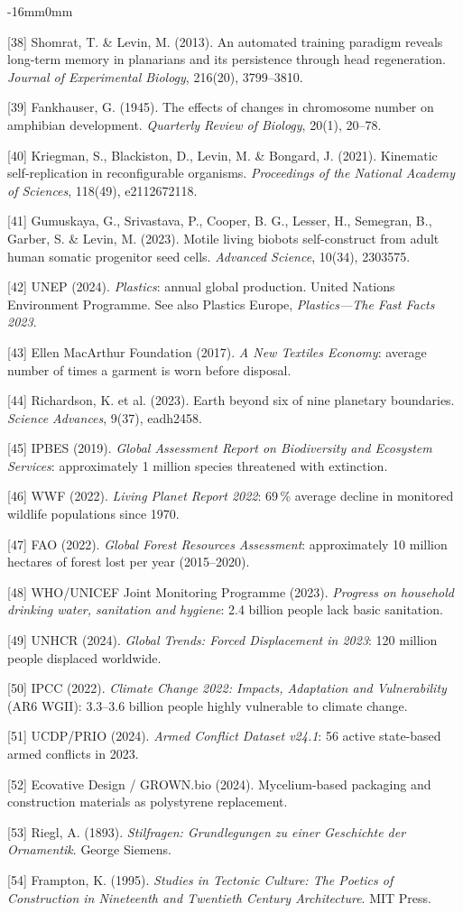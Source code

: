 \documentclass[10pt,oneside]{book}
\newcommand{\refentry}[1]{%
  \par\addvspace{0pt}%
  \begingroup\footnotesize\linespread{0.92}\selectfont
  \noindent\hangindent=4mm\hangafter=1 #1\par%
  \endgroup
}
\newenvironment{widebody}{%
  \begin{adjustwidth}{-16mm}{0mm}%
}{%
  \end{adjustwidth}%
}
\begin{document}
\begin{widebody}
\refentry{[38] Shomrat, T. \& Levin, M. (2013). An automated training paradigm reveals long-term memory in planarians and its persistence through head regeneration. \textit{Journal of Experimental Biology}, 216(20), 3799--3810.}
\refentry{[39] Fankhauser, G. (1945). The effects of changes in chromosome number on amphibian development. \textit{Quarterly Review of Biology}, 20(1), 20--78.}
\refentry{[40] Kriegman, S., Blackiston, D., Levin, M. \& Bongard, J. (2021). Kinematic self-replication in reconfigurable organisms. \textit{Proceedings of the National Academy of Sciences}, 118(49), e2112672118.}
\refentry{[41] Gumuskaya, G., Srivastava, P., Cooper, B. G., Lesser, H., Semegran, B., Garber, S. \& Levin, M. (2023). Motile living biobots self-construct from adult human somatic progenitor seed cells. \textit{Advanced Science}, 10(34), 2303575.}
\refentry{[42] UNEP (2024). \textit{Plastics}: annual global production. United Nations Environment Programme. See also Plastics Europe, \textit{Plastics---The Fast Facts 2023}.}
\refentry{[43] Ellen MacArthur Foundation (2017). \textit{A New Textiles Economy}: average number of times a garment is worn before disposal.}
\refentry{[44] Richardson, K. et al. (2023). Earth beyond six of nine planetary boundaries. \textit{Science Advances}, 9(37), eadh2458.}
\refentry{[45] IPBES (2019). \textit{Global Assessment Report on Biodiversity and Ecosystem Services}: approximately 1 million species threatened with extinction.}
\refentry{[46] WWF (2022). \textit{Living Planet Report 2022}: 69\,\% average decline in monitored wildlife populations since 1970.}
\refentry{[47] FAO (2022). \textit{Global Forest Resources Assessment}: approximately 10 million hectares of forest lost per year (2015--2020).}
\refentry{[48] WHO/UNICEF Joint Monitoring Programme (2023). \textit{Progress on household drinking water, sanitation and hygiene}: 2.4 billion people lack basic sanitation.}
\refentry{[49] UNHCR (2024). \textit{Global Trends: Forced Displacement in 2023}: 120 million people displaced worldwide.}
\refentry{[50] IPCC (2022). \textit{Climate Change 2022: Impacts, Adaptation and Vulnerability} (AR6 WGII): 3.3--3.6 billion people highly vulnerable to climate change.}
\refentry{[51] UCDP/PRIO (2024). \textit{Armed Conflict Dataset v24.1}: 56 active state-based armed conflicts in 2023.}
\refentry{[52] Ecovative Design / GROWN.bio (2024). Mycelium-based packaging and construction materials as polystyrene replacement.}
\refentry{[53] Riegl, A. (1893). \textit{Stilfragen: Grundlegungen zu einer Geschichte der Ornamentik}. George Siemens.}
\refentry{[54] Frampton, K. (1995). \textit{Studies in Tectonic Culture: The Poetics of Construction in Nineteenth and Twentieth Century Architecture}. MIT Press.}

\end{widebody}
\end{document}
